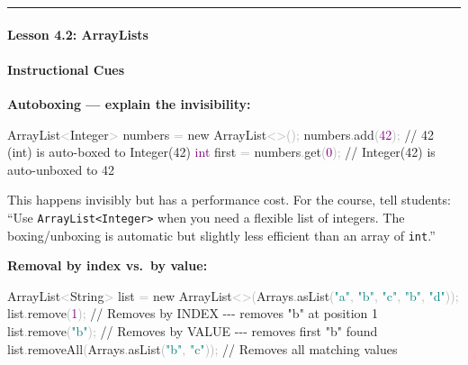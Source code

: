 \documentclass[
  justified,
  openright,
]{tufte-book}
\let\subsubsection\paragraph
\let\paragraph\paragraph
\newcommand{\BuiltInTok}[1]{#1}
\newcommand{\CommentTok}[1]{\textcolor{MidGray}{#1}}
\newcommand{\DataTypeTok}[1]{\textcolor{Purple}{#1}}
\newcommand{\DecValTok}[1]{\textcolor{Purple}{#1}}
\newcommand{\FunctionTok}[1]{\textcolor{BrandBlue}{#1}}
\newcommand{\KeywordTok}[1]{\textcolor{BrandBlue}{#1}}
\newcommand{\NormalTok}[1]{#1}
\newcommand{\OperatorTok}[1]{\textcolor{DarkGray}{#1}}
\newcommand{\StringTok}[1]{\textcolor{Teal}{#1}}
\newenvironment{Shaded}{%
  \begin{snugshade}
}{%
  \end{snugshade}
}
\let\subsubsection\paragraph
\let\paragraph\paragraph
\begin{document}
\begin{center}\rule{0.5\linewidth}{0.5pt}\end{center}

\subsubsection{Lesson 4.2: ArrayLists}\label{lesson-4.2-arraylists}

\paragraph{Instructional Cues}\label{instructional-cues-6}

\textbf{Autoboxing --- explain the invisibility:}

\begin{Shaded}
\begin{Highlighting}[]
\BuiltInTok{ArrayList}\OperatorTok{\textless{}}\BuiltInTok{Integer}\OperatorTok{\textgreater{}}\NormalTok{ numbers }\OperatorTok{=} \KeywordTok{new} \BuiltInTok{ArrayList}\OperatorTok{\textless{}\textgreater{}();}
\NormalTok{numbers}\OperatorTok{.}\FunctionTok{add}\OperatorTok{(}\DecValTok{42}\OperatorTok{);}        \CommentTok{// 42 (int) is auto{-}boxed to Integer(42)}
\DataTypeTok{int}\NormalTok{ first }\OperatorTok{=}\NormalTok{ numbers}\OperatorTok{.}\FunctionTok{get}\OperatorTok{(}\DecValTok{0}\OperatorTok{);}  \CommentTok{// Integer(42) is auto{-}unboxed to 42}
\end{Highlighting}
\end{Shaded}

This happens invisibly but has a performance cost. For the course, tell
students: ``Use \texttt{ArrayList\textless{}Integer\textgreater{}} when
you need a flexible list of integers. The boxing/unboxing is automatic
but slightly less efficient than an array of \texttt{int}.''

\textbf{Removal by index vs.~by value:}

\begin{Shaded}
\begin{Highlighting}[]
\BuiltInTok{ArrayList}\OperatorTok{\textless{}}\BuiltInTok{String}\OperatorTok{\textgreater{}}\NormalTok{ list }\OperatorTok{=} \KeywordTok{new} \BuiltInTok{ArrayList}\OperatorTok{\textless{}\textgreater{}(}\BuiltInTok{Arrays}\OperatorTok{.}\FunctionTok{asList}\OperatorTok{(}\StringTok{"a"}\OperatorTok{,} \StringTok{"b"}\OperatorTok{,} \StringTok{"c"}\OperatorTok{,} \StringTok{"b"}\OperatorTok{,} \StringTok{"d"}\OperatorTok{));}
\NormalTok{list}\OperatorTok{.}\FunctionTok{remove}\OperatorTok{(}\DecValTok{1}\OperatorTok{);}            \CommentTok{// Removes by INDEX {-}{-}{-} removes "b" at position 1}
\NormalTok{list}\OperatorTok{.}\FunctionTok{remove}\OperatorTok{(}\StringTok{"b"}\OperatorTok{);}          \CommentTok{// Removes by VALUE {-}{-}{-} removes first "b" found}
\NormalTok{list}\OperatorTok{.}\FunctionTok{removeAll}\OperatorTok{(}\BuiltInTok{Arrays}\OperatorTok{.}\FunctionTok{asList}\OperatorTok{(}\StringTok{"b"}\OperatorTok{,} \StringTok{"c"}\OperatorTok{));}  \CommentTok{// Removes all matching values}
\end{Highlighting}
\end{Shaded}
\end{document}
